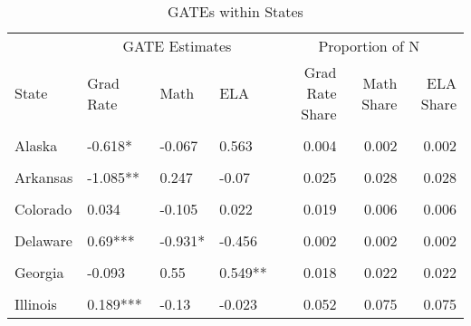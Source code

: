 \begin{table}[!h]
\centering
\caption{\label{tab:state_gates_combined}GATEs within States}
\centering
\begin{tabular}[t]{llllrrr}
\toprule
\multicolumn{1}{c}{ } & \multicolumn{3}{c}{GATE Estimates} & \multicolumn{3}{c}{Proportion of N} \\
\cmidrule(l{3pt}r{3pt}){2-4} \cmidrule(l{3pt}r{3pt}){5-7}
State & Grad Rate & Math & ELA & Grad Rate Share & Math Share & ELA Share\\
\midrule
\cellcolor{gray!10}{Alabama} & \cellcolor{gray!10}{0.206***} & \cellcolor{gray!10}{0.315*} & \cellcolor{gray!10}{0.043} & \cellcolor{gray!10}{0.012} & \cellcolor{gray!10}{0.014} & \cellcolor{gray!10}{0.014}\\
Alaska & -0.618* & -0.067 & 0.563 & 0.004 & 0.002 & 0.002\\
\cellcolor{gray!10}{Arizona} & \cellcolor{gray!10}{-0.198} & \cellcolor{gray!10}{0.101} & \cellcolor{gray!10}{0.025} & \cellcolor{gray!10}{0.012} & \cellcolor{gray!10}{0.016} & \cellcolor{gray!10}{0.016}\\
Arkansas & -1.085** & 0.247 & -0.07 & 0.025 & 0.028 & 0.028\\
\cellcolor{gray!10}{California} & \cellcolor{gray!10}{-0.054} & \cellcolor{gray!10}{0.501***} & \cellcolor{gray!10}{0.236**} & \cellcolor{gray!10}{0.046} & \cellcolor{gray!10}{0.063} & \cellcolor{gray!10}{0.063}\\
Colorado & 0.034 & -0.105 & 0.022 & 0.019 & 0.006 & 0.006\\
\cellcolor{gray!10}{Connecticut} & \cellcolor{gray!10}{0.185***} & \cellcolor{gray!10}{-0.028} & \cellcolor{gray!10}{-0.174***} & \cellcolor{gray!10}{0.012} & \cellcolor{gray!10}{0.015} & \cellcolor{gray!10}{0.015}\\
Delaware & 0.69*** & -0.931* & -0.456 & 0.002 & 0.002 & 0.002\\
\cellcolor{gray!10}{Florida} & \cellcolor{gray!10}{0.192***} & \cellcolor{gray!10}{0.917***} & \cellcolor{gray!10}{0.724***} & \cellcolor{gray!10}{0.007} & \cellcolor{gray!10}{0.007} & \cellcolor{gray!10}{0.007}\\
Georgia & -0.093 & 0.55 & 0.549** & 0.018 & 0.022 & 0.022\\
\cellcolor{gray!10}{Idaho} & \cellcolor{gray!10}{-0.148} & \cellcolor{gray!10}{-0.218} & \cellcolor{gray!10}{-0.078} & \cellcolor{gray!10}{0.012} & \cellcolor{gray!10}{0.010} & \cellcolor{gray!10}{0.010}\\
Illinois & 0.189*** & -0.13 & -0.023 & 0.052 & 0.075 & 0.075\\

\end{tabular}
\end{table}
